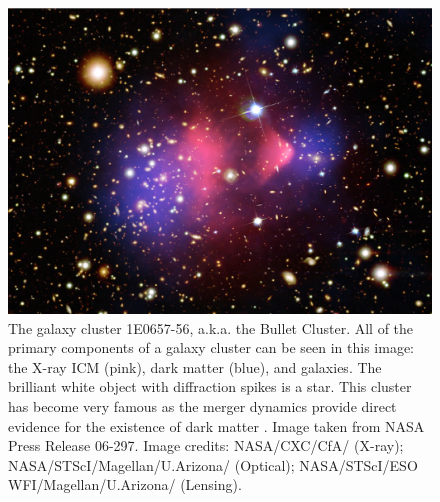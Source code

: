 \begin{figure}[htp]
  \begin{center}
    \includegraphics*[width=\textwidth, trim=0mm 0mm 0mm 0mm, clip]{bullet}
    \caption[Composite image of the Bullet Cluster]{The
      galaxy cluster 1E0657-56, a.k.a. the Bullet Cluster. All of the
      primary components of a galaxy cluster can be seen in this image:
      the X-ray ICM (pink), dark matter (blue), and galaxies. The
      brilliant white object with diffraction spikes is a star. This
      cluster has become very famous as the merger dynamics provide direct
      evidence for the existence of dark matter
      \citep{2006ApJ...648L.109C}. Image taken from NASA Press Release
      06-297. Image credits: NASA/CXC/CfA/\citet{2002ApJ...567L..27M}
      (X-ray); NASA/STScI/Magellan/U.Arizona/\citet{2006ApJ...648L.109C}
      (Optical); NASA/STScI/ESO
      WFI/Magellan/U.Arizona/\citet{2006ApJ...648L.109C} (Lensing).}
    \label{fig:bullet}
  \end{center}
\end{figure}

